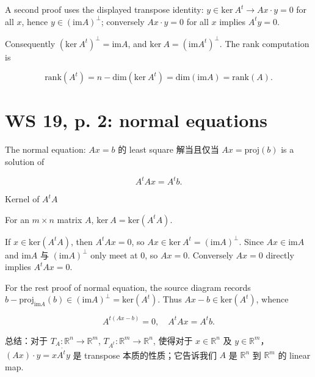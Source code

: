 A second proof uses the displayed transpose identity: \(y \in \text{ker}\ A^{t}\rightarrow Ax \cdot y = 0\) for all \(x\), hence \(y{\in \left( {\text{im}A} \right)}^{\perp}\); conversely \(Ax \cdot y = 0\) for all \(x\) implies \(A^{t}y = 0\).

Consequently \(\left( {\text{ker}\ A^{t}} \right)^{\perp} = \text{im}A\), and \(\text{ker}\ A = \left( {\text{im}A^{t}} \right)^{\perp}\). The rank computation is

\[\text{rank}\left( A^{t} \right) = n - \text{dim}\left( {\text{ker}\ A^{t}} \right) = \text{dim}\left( {\text{im}A} \right) = \text{rank}(A).\]

\section{WS 19, p. 2: normal equations}

The normal equation: \(Ax = b\) 的 least square 解当且仅当 \(Ax = \text{proj}(b)\) is a solution of

\[A^{t}Ax = A^{t}b.\]

\begin{theorem}{Kernel of \(A^{t}A\)}

For an \(m \times n\) matrix \(A\), \(\text{ker}\ A = \text{ker}\left( {A^{t}A} \right)\).

\end{theorem}

If \(x \in \text{ker}\left( {A^{t}A} \right)\), then \(A^{t}Ax = 0\), so \(Ax \in \text{ker}\ A^{t} = \left( {\text{im}A} \right)^{\perp}\). Since \(Ax \in \text{im}A\) and \(\text{im}A\) 与 \(\left( {\text{im}A} \right)^{\perp}\) only meet at \(0\), so \(Ax = 0\). Conversely \(Ax = 0\) directly implies \(A^{t}Ax = 0\).

For the rest proof of normal equation, the source diagram records \(b - \text{proj}_{\text{im}A}(b){\in \left( {\text{im}A} \right)}^{\perp} = \text{ker}\left( A^{t} \right)\). Thus \(Ax - b \in \text{ker}\left( A^{t} \right)\), whence

\[A^{t{({Ax - b})}} = 0,\quad A^{t}Ax = A^{t}b.\]

总结：对于 \(T_{A}:\mathbb{R}^{n}\rightarrow\mathbb{R}^{m}\), \(T_{A^{t}}:\mathbb{R}^{m}\rightarrow\mathbb{R}^{n}\), 使得对于 \(x \in \mathbb{R}^{n}\) 及 \(y \in \mathbb{R}^{m}\)，\(\left( {Ax} \right) \cdot y = x\dot{A^{t}y}\) 是 transpose 本质的性质；它告诉我们 \(A\) 是 \(\mathbb{R}^{n}\) 到 \(\mathbb{R}^{m}\) 的 linear map.
